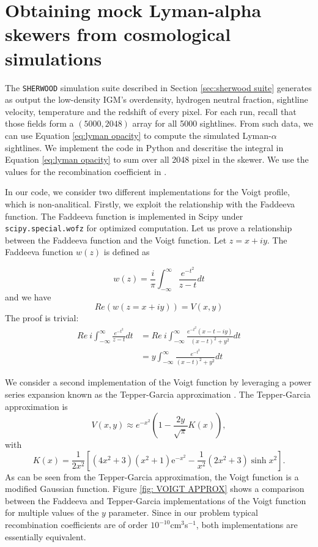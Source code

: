 \section{Obtaining mock Lyman-alpha skewers from cosmological simulations}
The \texttt{SHERWOOD} simulation suite described in Section \ref{sec:sherwood suite} generates as output the low-density IGM's overdensity, hydrogen neutral fraction, sightline velocity, temperature and the redshift of every pixel. For each run, recall that those fields form a $(5000,2048)$ array for all 5000 sightlines. From such data, we can use Equation \ref{eq:lyman opacity} to compute the simulated Lyman-$\alpha$ sightlines. We implement the code in Python and descritise the integral in Equation \ref{eq:lyman opacity} to sum over all 2048 pixel in the skewer. We use the values for the recombination coefficient in \cite{Luki__2014}.

In our code, we consider two different implementations for the Voigt profile, which is non-analitical. Firstly, we exploit the relationship with the Faddeeva function. The Faddeeva function is implemented in Scipy under \texttt{scipy.special.wofz} for optimized computation. Let us prove a relationship between the Faddeeva function and the Voigt function. Let $z=x+iy$.
The Faddeeva function $w(z)$ is defined as

\begin{equation}
    w(z)=\frac{i}{\pi} \int_{-\infty}^{\infty} \frac{e^{-t^2}}{z-t}dt
\end{equation}
and we have 
\begin{equation}\label{eq:FAD}
    Re \left( w(z=x+iy) \right)=V(x,y)
\end{equation}
The proof is trivial:
\begin{equation}
    \begin{split}
        Re\ i \int_{-\infty}^{\infty} \frac{e^{-t^2}}{z-t}dt
        &= Re\ i \int_{-\infty}^{\infty} \frac{e^{-t^2} (x-t-iy)}{(x-t)^2+y^2}dt\\
        &=y\int_{-\infty}^{\infty} \frac{e^{-t^2}}{(x-t)^2+y^2}dt
    \end{split}
\end{equation}

We consider a second implementation of the Voigt function by leveraging a power series expansion known as the Tepper-Garcia approximation \cite{Tepper_Garc_a_2006}. The Tepper-Garcia approximation is
\begin{equation}\label{eq:Tepper}
        V(x,y)\approx e^{-x^2}\left( 1-\frac{2y}{\sqrt{\pi}} K(x) \right),
\end{equation}
with
\begin{equation}
        K(x)=\frac1{2x^2}\left[(4x^2+3)\left(x^2+1\right)\mathrm{e}^{-x^2}-\frac1{x^2}(2x^2+3)\sinh x^2\right].
\end{equation}
As can be seen from the Tepper-Garcia approximation, the Voigt function is a modified Gaussian function. Figure \ref{fig: VOIGT APPROX} shows a comparison between the Faddeeva and Tepper-Garcia implementations of the Voigt function for multiple values of the $y$ parameter. Since in our problem typical recombination coefficients are of order $10^{-10}$cm$^3$s$^{-1}$, both implementations are essentially equivalent.


